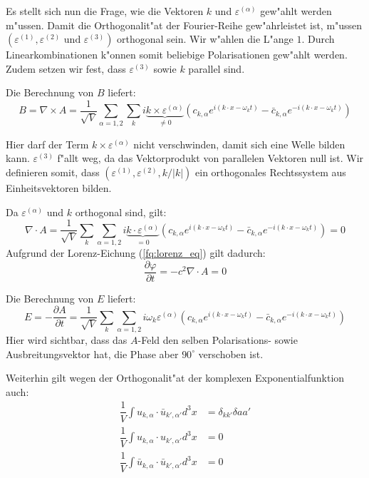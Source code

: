 Es stellt sich nun die Frage, wie die Vektoren $k$ und $\varepsilon^{(\alpha)}$ gew"ahlt werden m"ussen. Damit die Orthogonalit"at der Fourier-Reihe gew"ahrleistet ist, m"ussen $(\varepsilon^{(1)}, \varepsilon^{(2)} \text{ und } \varepsilon^{(3)})$ orthogonal sein. Wir w"ahlen die L"ange $1$. Durch Linearkombinationen k"onnen somit beliebige Polarisationen gew"ahlt werden. Zudem setzen wir fest, dass $\varepsilon^{(3)}$ sowie $k$ parallel sind.

Die Berechnung von $B$ liefert:
\begin{equation*}
B = \nabla \times A = \frac{1}{ \sqrt{V}} \sum_{\alpha=1,2}  \sum_k i \underbrace{k \times \varepsilon^{(\alpha)}}_{\neq 0} \left(c_{k,\alpha} e^{i (k \cdot x - \omega_k t)} - \bar{c}_{k,\alpha} e^{-i(k \cdot x - \omega_k t)} \right)
\end{equation*}

Hier darf der Term $k \times \varepsilon^{(\alpha)}$ nicht verschwinden, damit sich eine Welle bilden kann. $\varepsilon^{(3)}$ f"allt weg, da das Vektorprodukt von parallelen Vektoren null ist. Wir definieren somit, dass $(\varepsilon^{(1)}, \varepsilon^{(2)} , k/|k|)$ ein orthogonales Rechtssystem aus Einheitsvektoren bilden.

Da $\varepsilon^{(\alpha)}$ und $k$ orthogonal sind, gilt:
\begin{equation*}
\nabla \cdot A = \frac{1}{\sqrt{V}} \sum_k \sum_{\alpha=1,2} i \underbrace{k \cdot \varepsilon^{(\alpha)}}_{=0} \left(c_{k,\alpha} e^{i (k \cdot x - \omega_k t)} - \bar{c}_{k,\alpha} e^{-i(k \cdot x - \omega_k t)}\right) = 0
\end{equation*}
Aufgrund der Lorenz-Eichung (\ref{fq:lorenz_eq}) gilt dadurch:
\begin{equation*}
\frac{\partial \varphi }{\partial t} = - c^2 \nabla \cdot A = 0
\end{equation*}

Die Berechnung von $E$ liefert:
\begin{equation*}
	E = - \frac{\partial A}{\partial t} = \frac{1}{\sqrt{V}} \sum_k \sum_{\alpha=1,2} i \omega_k \varepsilon^{(\alpha)} \left(c_{k,\alpha} e^{i (k \cdot x - \omega_k t)} - \bar{c}_{k,\alpha} e^{-i(k \cdot x - \omega_k t)} \right)
\end{equation*}
Hier wird sichtbar, dass das $A$-Feld den selben Polarisations- sowie Ausbreitungsvektor hat, die Phase aber $90^\circ$ verschoben ist.

Weiterhin gilt wegen der Orthogonalit"at der komplexen Exponentialfunktion auch:
\begin{align*}
\dfrac{1}{V} \int u_{k,\alpha} \cdot \bar{u}_{k',\alpha'} d^3 x &= \delta_{kk'}\delta{aa'} \\
\dfrac{1}{V} \int u_{k,\alpha} \cdot u_{k',\alpha'} d^3 x &= 0 \\
\dfrac{1}{V} \int \bar{u}_{k,\alpha} \cdot \bar{u}_{k',\alpha'} d^3 x &= 0
\end{align*}

